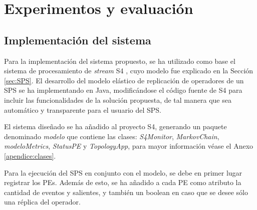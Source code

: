 \chapter{Experimentos y evaluaci\'on}
\label{cap:experimentos}

\section{Implementaci\'on del sistema}
Para la implementaci\'on del sistema propuesto, se ha utilizado como base el sistema de procesamiento de \textit{stream} S4 \citep{s4}, cuyo modelo fue explicado en la Secci\'on \ref{sec:SPS}. El desarrollo del modelo el\'astico de replicaci\'on de operadores de un SPS se ha implementando en Java, modific\'andose el c\'odigo fuente de S4 para incluir las funcionalidades de la soluci\'on propuesta, de tal manera que sea autom\'atico y transparente para el usuario del SPS.

El sistema dise\~nado se ha a\~nadido al proyecto S4, generando un paquete denominado \textit{modelo} que contiene las clases: \textit{S4Monitor}, \textit{MarkovChain}, \textit{modeloMetrics}, \textit{StatusPE} y \textit{\mbox{TopologyApp}}, para mayor informaci\'on v\'ease el Anexo \ref{apendice:clases}.

Para la ejecuci\'on del SPS en conjunto con el modelo, se debe en primer lugar registrar los PEs. Adem\'as de esto, se ha a\~nadido a cada PE como atributo la cantidad de eventos y salientes, y tambi\'en un boolean en caso que se desee s\'olo una r\'eplica del operador.


